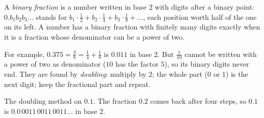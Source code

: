 \begin{definition}\label{def:g10:floating-point:binary-fraction}
A \emph{binary fraction} is a number written in base $2$ with digits after a binary point:
$0.b_1 b_2 b_3 \dots$ stands for $b_1 \cdot \tfrac12 + b_2 \cdot \tfrac14 + b_3 \cdot \tfrac18 + \dots$, each
position worth half of the one on its left. A number has a binary fraction with finitely many digits exactly when
it is a fraction whose denominator can be a power of two.
\end{definition}

For example, $0.375 = \tfrac38 = \tfrac14 + \tfrac18$ is $0.011$ in base $2$. But $\tfrac1{10}$ cannot be written
with a power of two as denominator ($10$ has the factor $5$), so its binary digits never end. They are found by
\emph{doubling}: multiply by $2$; the whole part ($0$ or $1$) is the next digit; keep the fractional part and repeat.

\begin{omfigure}

{\small The doubling method on $0.1$. The fraction $0.2$ comes back after four steps, so $0.1$ is
$0.0\,0011\,0011\,0011\dots$ in base $2$.}
\end{omfigure}

